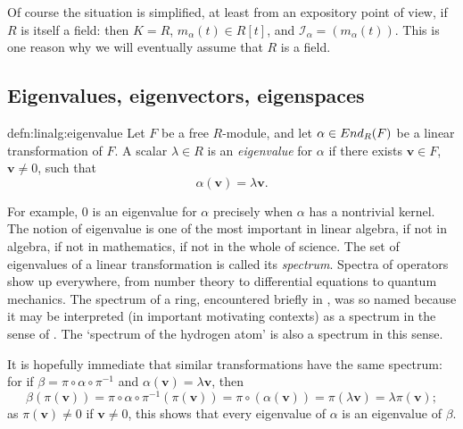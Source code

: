 Of course the situation is simplified, at least from an expository
point of view, if $R$ is itself a field: then $K = R$,
$m_\alpha(t) \in R[t]$, and $\mathscr{I}_\alpha = (m_\alpha(t))$. This
is one reason why we will eventually assume that $R$ is a field.

\subsection{Eigenvalues, eigenvectors, eigenspaces}
\label{subsec:linalg:eigenvalues-eigenvectors-eigenspaces}

\begin{defn}{}{defn:linalg:eigenvalue}
  Let $F$ be a free $R$-module, and let $\alpha \in End_R(F)$ be a
  linear transformation of $F$.  A scalar $\lambda \in R$ is an
  \emph{eigenvalue} for $\alpha$ if there exists $\mathbf{v} \in F$,
  $\mathbf{v} \neq 0$, such that
  \[
    \alpha(\mathbf{v}) = \lambda\mathbf{v}.
  \]
\end{defn}
For example, $0$ is an eigenvalue for $\alpha$ precisely when $\alpha$
has a nontrivial kernel. The notion of eigenvalue is one of the most
important in linear algebra, if not in algebra, if not in mathematics,
if not in the whole of science. The set of eigenvalues of a linear
transformation is called its \emph{spectrum}. Spectra of operators
show up everywhere, from number theory to differential equations to
quantum mechanics. The spectrum of a ring, encountered briefly in
, was so named because
it may be interpreted (in important motivating contexts) as a spectrum
in the sense of . The `spectrum of the hydrogen
atom' is also a spectrum in this sense.

It is hopefully immediate that similar transformations have the same
spectrum: for if $\beta = \pi \circ \alpha \circ \pi^{-1}$ and
$\alpha(\mathbf{v}) = \lambda\mathbf{v}$, then
\[
  \beta(\pi(\mathbf{v})) = \pi \circ \alpha \circ
  \pi^{-1}(\pi(\mathbf{v})) = \pi \circ (\alpha(\mathbf{v})) =
  \pi(\lambda\mathbf{v}) = \lambda\pi(\mathbf{v});
\]
as $\pi(\mathbf{v}) \neq 0$ if $\mathbf{v} \neq 0$, this shows that
every eigenvalue of $\alpha$ is an eigenvalue of $\beta$.

